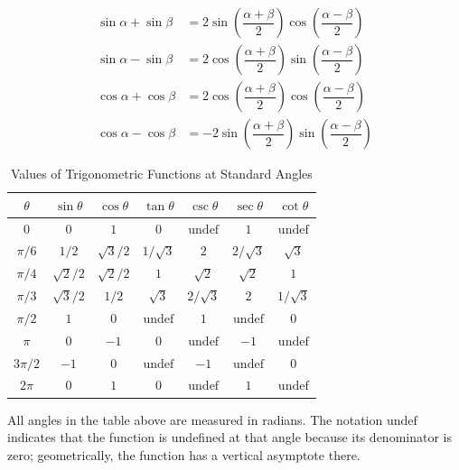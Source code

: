 \begin{proposition}\label{prop:A-7}
\begin{align*}
  \sin\alpha + \sin\beta
    &= 2\sin\!\left(\dfrac{\alpha+\beta}{2}\right)
        \cos\!\left(\dfrac{\alpha-\beta}{2}\right) \\
  \sin\alpha - \sin\beta
    &= 2\cos\!\left(\dfrac{\alpha+\beta}{2}\right)
        \sin\!\left(\dfrac{\alpha-\beta}{2}\right) \\
  \cos\alpha + \cos\beta
    &= 2\cos\!\left(\dfrac{\alpha+\beta}{2}\right)
        \cos\!\left(\dfrac{\alpha-\beta}{2}\right) \\
  \cos\alpha - \cos\beta
    &= -2\sin\!\left(\dfrac{\alpha+\beta}{2}\right)
         \sin\!\left(\dfrac{\alpha-\beta}{2}\right)
\end{align*}
\end{proposition}

\begin{table}[h]
\centering
\caption{Values of Trigonometric Functions at Standard Angles}
\begin{tabular}{@{}ccccccc@{}}
\toprule
$\theta$
  & $\sin\theta$ & $\cos\theta$ & $\tan\theta$
  & $\csc\theta$ & $\sec\theta$ & $\cot\theta$ \\
\midrule
$0$
  & $0$ & $1$ & $0$
  & $\text{undef}$ & $1$ & $\text{undef}$ \\
$\pi/6$
  & $1/2$ & $\sqrt{3}/2$ & $1/\sqrt{3}$
  & $2$ & $2/\sqrt{3}$ & $\sqrt{3}$ \\
$\pi/4$
  & $\sqrt{2}/2$ & $\sqrt{2}/2$ & $1$
  & $\sqrt{2}$ & $\sqrt{2}$ & $1$ \\
$\pi/3$
  & $\sqrt{3}/2$ & $1/2$ & $\sqrt{3}$
  & $2/\sqrt{3}$ & $2$ & $1/\sqrt{3}$ \\
$\pi/2$
  & $1$ & $0$ & $\text{undef}$
  & $1$ & $\text{undef}$ & $0$ \\
$\pi$
  & $0$ & $-1$ & $0$
  & $\text{undef}$ & $-1$ & $\text{undef}$ \\
$3\pi/2$
  & $-1$ & $0$ & $\text{undef}$
  & $-1$ & $\text{undef}$ & $0$ \\
$2\pi$
  & $0$ & $1$ & $0$
  & $\text{undef}$ & $1$ & $\text{undef}$ \\
\bottomrule
\end{tabular}
\end{table}

\begin{remark}
All angles in the table above are measured in radians. The notation
$\text{undef}$ indicates that the function is undefined at that angle
because its denominator is zero; geometrically, the function has a
vertical asymptote there.
\end{remark}


